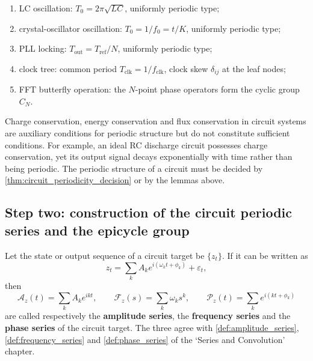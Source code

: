 \begin{example}\label{ex:circuit_periodic_examples}
\begin{enumerate}[label=(\roman*)]
    \item LC oscillation: $T_0=2\pi\sqrt{LC}$, uniformly periodic type;
    \item crystal-oscillator oscillation: $T_0=1/f_0=t/K$, uniformly periodic type;
    \item PLL locking: $T_{\text{out}}=T_{\text{ref}}/N$, uniformly periodic type;
    \item clock tree: common period $T_{\text{clk}}=1/f_{\text{clk}}$, clock skew $\delta_{ij}$ at the leaf nodes;
    \item FFT butterfly operation: the $N$-point phase operators form the cyclic group $C_N$.
\end{enumerate}
\end{example}

\begin{remark}\label{rem:circuit_invariant_not_period}
Charge conservation, energy conservation and flux conservation in circuit systems are auxiliary conditions for periodic structure but do not constitute sufficient conditions. For example, an ideal RC discharge circuit possesses charge conservation, yet its output signal decays exponentially with time rather than being periodic. The periodic structure of a circuit must be decided by \cref{thm:circuit_periodicity_decision} or by the lemmas above.
\end{remark}

\subsection{Step two: construction of the circuit periodic series and the epicycle group}

\begin{definition}\label{def:circuit_series}
Let the state or output sequence of a circuit target be $\{z_t\}$. If it can be written as
\[
z_t=\sum_k A_k e^{i(\omega_k t+\phi_k)}+\varepsilon_t,
\]
then
\[
\mathcal A_z(t)=\sum_k A_k e^{ikt},\qquad
\mathcal F_z(s)=\sum_k \omega_k s^k,\qquad
\mathcal P_z(t)=\sum_k e^{i(kt+\phi_k)}
\]
are called respectively the \textbf{amplitude series}, the \textbf{frequency series} and the \textbf{phase series} of the circuit target. The three agree with \cref{def:amplitude_series}, \cref{def:frequency_series} and \cref{def:phase_series} of the `Series and Convolution' chapter.
\end{definition}

